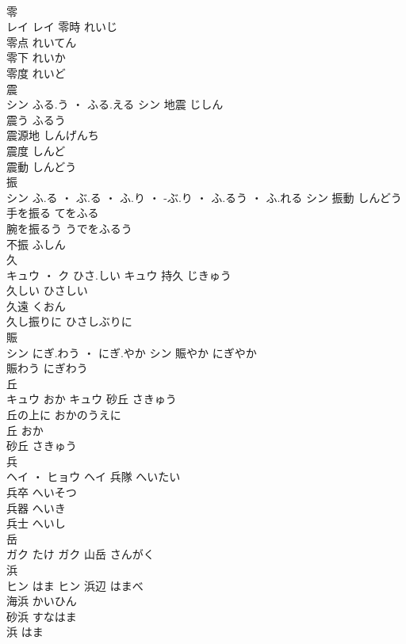 \documentclass[8pt]{extreport}
\begin{document}
\begin{CJK}{UTF8}{min}
\\	零	
\\	レイ		レイ	零時	れいじ	
\\	零点	れいてん	
\\	零下	れいか	
\\	零度	れいど	
\\	震	
\\	シン	ふる.う ・ ふる.える	シン	地震	じしん	
\\	震う	ふるう	
\\	震源地	しんげんち	
\\	震度	しんど	
\\	震動	しんどう	
\\	振	
\\	シン	ふ.る ・ ぶ.る ・ ふ.り ・ -ぶ.り ・ ふ.るう ・ ふ.れる	シン	振動	しんどう	
\\	手を振る	てをふる	
\\	腕を振るう	うでをふるう	
\\	不振	ふしん	
\\	久	
\\	キュウ ・ ク	ひさ.しい	キュウ	持久	じきゅう	
\\	久しい	ひさしい	
\\	久遠	くおん	
\\	久し振りに	ひさしぶりに	
\\	賑	
\\	シン	にぎ.わう ・ にぎ.やか	シン	賑やか	にぎやか	
\\	賑わう	にぎわう	
\\	丘	
\\	キュウ	おか	キュウ	砂丘	さきゅう	
\\	丘の上に	おかのうえに	
\\	丘	おか	
\\	砂丘	さきゅう	
\\	兵	
\\	ヘイ ・ ヒョウ		ヘイ	兵隊	へいたい	
\\	兵卒	へいそつ	
\\	兵器	へいき	
\\	兵士	へいし	
\\	岳	
\\	ガク	たけ	ガク													山岳	さんがく	
\\	浜	
\\	ヒン	はま	ヒン	浜辺	はまべ	
\\	海浜	かいひん	
\\	砂浜	すなはま	
\\	浜	はま	

\end{CJK}
\end{document}
